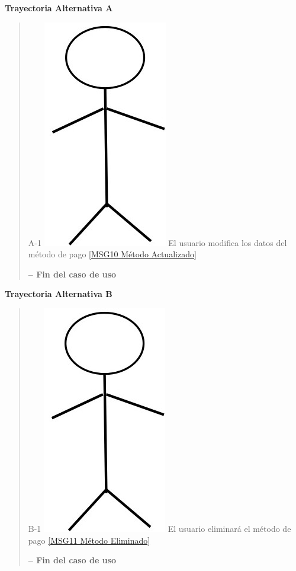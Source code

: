 \documentclass[14pt]{article}
\begin{document}
                \vspace{0.5cm}\textbf{Trayectoria Alternativa A}\label{CU-1.7 Trayectoria Alternativa A}
                    \begin{quote}
                        \item A-1   \includegraphics[height=0.02\textwidth]{Actor.jpg}
                            \label{Actor} El usuario modifica los datos del método de pago \ref{MSG10 Método Actualizado}
                        
                        \vspace{0.3cm}\textbf{-- Fin del caso de uso}
                    \end{quote}
                
                \vspace{0.5cm}\textbf{Trayectoria Alternativa B}\label{CU-1.7 Trayectoria Alternativa B}
                    \begin{quote}
                        \item B-1  \includegraphics[height=0.02\textwidth]{Actor.jpg}
                            \label{Actor} El usuario eliminará el método de pago \ref{MSG11 Método Eliminado}
                        
                        \vspace{0.3cm}\textbf{-- Fin del caso de uso}
                    \end{quote}
              
            \newpage        
\end{document}
